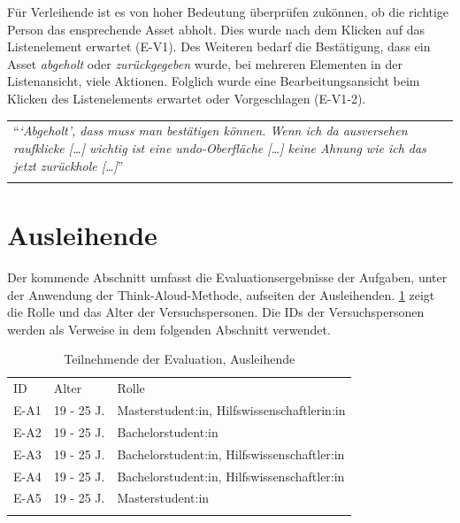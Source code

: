 Für Verleihende ist es von hoher Bedeutung überprüfen zukönnen, ob die richtige
Person das ensprechende Asset abholt. Dies wurde nach dem Klicken auf das
Listenelement erwartet (E-V1). Des Weiteren bedarf die Bestätigung, dass ein
Asset \textit{abgeholt} oder \textit{zurückgegeben} wurde, bei mehreren
Elementen in der Listenansicht, viele Aktionen. Folglich wurde eine
Bearbeitungsansicht beim Klicken des Listenelements erwartet oder Vorgeschlagen
(E-V1-2).

\begin{longtable}{p{}} \arrayrulecolor{maincolor}\hline
  \enquote{\textit{\enquote{Abgeholt}, dass muss man bestätigen können. Wenn ich
  da ausversehen raufklicke [\dots] wichtig ist eine undo-Oberfläche [\dots]
  keine Ahnung wie ich das jetzt zurückhole [\dots]}} \\
  \arrayrulecolor{maincolor}\hline
\end{longtable}

\section{Ausleihende}

Der kommende Abschnitt umfasst die Evaluationsergebnisse der Aufgaben, unter der
Anwendung der Think-Aloud-Methode, aufseiten der Ausleihenden. \ref{table:azwei}
zeigt die Rolle und das Alter der Versuchspersonen. Die IDs der Versuchspersonen
werden als Verweise in dem folgenden Abschnitt verwendet.

\begin{table}[h]
  \centering
  \caption{Teilnehmende der Evaluation, Ausleihende}
  \begin{tabular}{lll}
    \arrayrulecolor{maincolor}\hline
    \sffamily\color{maincolor}ID & \sffamily\color{maincolor}Alter &
    \sffamily\color{maincolor}Rolle                                  \\
    \arrayrulecolor{maincolor}\hline
    E-A1                         & 19 - 25 J.                      &
    Masterstudent:in, Hilfswissenschaftlerin:in                      \\
    E-A2                         & 19 - 25 J.                      &
    Bachelorstudent:in                                               \\
    E-A3                         & 19 - 25 J.                      &
    Bachelorstudent:in, Hilfswissenschaftler:in                      \\
    E-A4                         & 19 - 25 J.                      &
    Bachelorstudent:in, Hilfswissenschaftler:in                      \\
    E-A5                         & 19 - 25 J.                      &
    Masterstudent:in                                                 \\
    \arrayrulecolor{maincolor}\hline
  \end{tabular}
  \label{table:azwei}
\end{table}

